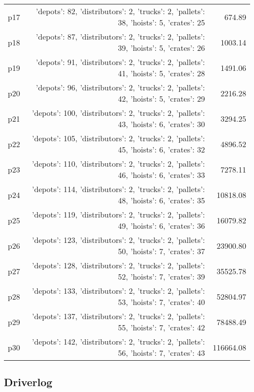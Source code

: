\documentclass{article}
\begin{document}
\begin{center}
\begin{tabular}{@{}l|r|r@{}}
  p17&{'depots': 82, 'distributors': 2, 'trucks': 2, 'pallets': 38, 'hoists': 5, 'crates': 25}&674.89\\
  p18&{'depots': 87, 'distributors': 2, 'trucks': 2, 'pallets': 39, 'hoists': 5, 'crates': 26}&1003.14\\
  p19&{'depots': 91, 'distributors': 2, 'trucks': 2, 'pallets': 41, 'hoists': 5, 'crates': 28}&1491.06\\
  p20&{'depots': 96, 'distributors': 2, 'trucks': 2, 'pallets': 42, 'hoists': 5, 'crates': 29}&2216.28\\
  p21&{'depots': 100, 'distributors': 2, 'trucks': 2, 'pallets': 43, 'hoists': 6, 'crates': 30}&3294.25\\
  p22&{'depots': 105, 'distributors': 2, 'trucks': 2, 'pallets': 45, 'hoists': 6, 'crates': 32}&4896.52\\
  p23&{'depots': 110, 'distributors': 2, 'trucks': 2, 'pallets': 46, 'hoists': 6, 'crates': 33}&7278.11\\
  p24&{'depots': 114, 'distributors': 2, 'trucks': 2, 'pallets': 48, 'hoists': 6, 'crates': 35}&10818.08\\
  p25&{'depots': 119, 'distributors': 2, 'trucks': 2, 'pallets': 49, 'hoists': 6, 'crates': 36}&16079.82\\
  p26&{'depots': 123, 'distributors': 2, 'trucks': 2, 'pallets': 50, 'hoists': 7, 'crates': 37}&23900.80\\
  p27&{'depots': 128, 'distributors': 2, 'trucks': 2, 'pallets': 52, 'hoists': 7, 'crates': 39}&35525.78\\
  p28&{'depots': 133, 'distributors': 2, 'trucks': 2, 'pallets': 53, 'hoists': 7, 'crates': 40}&52804.97\\
  p29&{'depots': 137, 'distributors': 2, 'trucks': 2, 'pallets': 55, 'hoists': 7, 'crates': 42}&78488.49\\
  p30&{'depots': 142, 'distributors': 2, 'trucks': 2, 'pallets': 56, 'hoists': 7, 'crates': 43}&116664.08
                            \end{tabular}
                            \end{center}
                    
                            \newpage \subsection{Driverlog}
\end{document}
